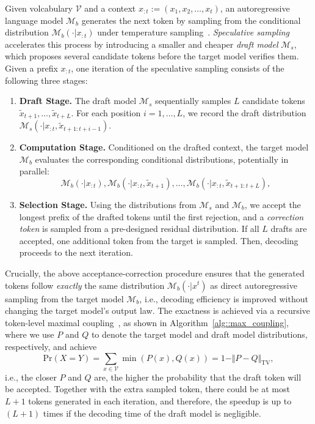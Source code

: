 \documentclass{article}
\theoremstyle{plain}
\theoremstyle{definition}
\begin{document}
Given volcabulary $\mathcal V$ and a context $x_{:t}:=(x_1,x_2, \ldots,x_t)$, an autoregressive language model $\mathcal{M}_b$ generates the next token by sampling from the conditional distribution $\mathcal{M}_b(\cdot| x_{:t})$ under temperature sampling~\citep{ackley1985learning,ficler2017controlling}. 
\emph{Speculative sampling} accelerates this process by introducing a smaller and cheaper \emph{draft model} $\mathcal{M}_s$, which proposes several candidate tokens before the target model verifies them. 
Given a prefix $x_{:t}$, one iteration of the speculative sampling consists of the following three stages:
\begin{enumerate}
    \item  \hspace{-3.9pt} \textbf{Draft Stage.} The draft model $\mathcal{M}_s$ sequentially samples $L$ candidate tokens $\tilde{x}_{t+1},\ldots,\tilde{x}_{t+L}$. For each position $i=1,\ldots,L$, we record the draft distribution $\mathcal{M}_s(\cdot| x_{:t}, \tilde{x}_{t+1:t+i-1})$. 

    \item \hspace{-3.9pt} \textbf{Computation Stage.} Conditioned on the drafted context, the target model $\mathcal{M}_b$ evaluates the corresponding conditional distributions, %
    potentially in parallel:
    \[
    \mathcal{M}_b(\cdot| x_{:t}),
    \mathcal{M}_b(\cdot| x_{:t}, \tilde{x}_{t+1}), \ldots,
    \mathcal{M}_b(\cdot| x_{:t}, \tilde{x}_{t+1:t+L}), 
    \]
    
    \item \hspace{-3.9pt} \textbf{Selection Stage.} Using the distributions from $\mathcal{M}_s$ and $\mathcal{M}_b$, we accept the %
    longest prefix of the drafted tokens until the first rejection, and a \emph{correction token} is sampled from a pre-designed residual distribution. If all $L$ drafts are accepted, one additional token from the target is sampled. Then, decoding proceeds to the next iteration. 
\end{enumerate}

 
Crucially, the above acceptance-correction procedure ensures that the generated tokens follow \emph{exactly} the same distribution $\mathcal{M}_b(\cdot | x^t)$ as direct autoregressive sampling from the target model $\mathcal{M}_b$, i.e., decoding efficiency is improved without changing the target model's output law. 
The exactness is achieved via a recursive token-level maximal coupling~\citep{sun2023spectr,chen2023accelerating,leviathan2023fast}, as shown in Algorithm~\ref{alg::max_coupling}, where we use $P$ and $Q$ to denote the target model and draft model distributions, respectively, and achieve
\[
\mathrm{Pr}(X = Y) = \sum_{x\in\mathcal{V}} \min (P(x), Q(x)) = 1 - \Vert P - Q\Vert_\mathrm{TV}, 
\]
i.e., the closer $P$ and $Q$ are, the higher the probability that the draft token will be accepted. 
Together with the extra sampled token, there could be at most $L + 1$ tokens %
generated in each iteration, and therefore, the speedup is up to $(L+1)$ times if the decoding time of the draft model is negligible. 
\end{document}
